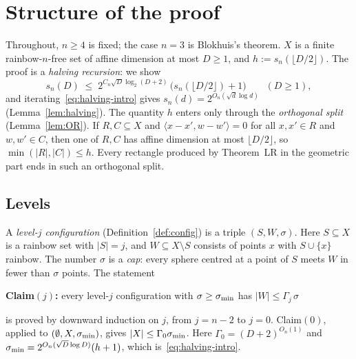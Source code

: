 \section{Structure of the proof}\label{sec:structure}

Throughout, $n\ge 4$ is fixed; the case $n=3$ is Blokhuis's theorem. $X$ is a finite rainbow-$n$-free set of
affine dimension at most $D\ge 1$, and $h:=s_n(\lfloor D/2\rfloor)$. The proof is a \emph{halving recursion}: we
show
\begin{equation}\label{eq:halving-intro}
  s_n(D)\;\le\;2^{C_n\sqrt D\log_2(D+2)}\,\bigl(s_n(\lfloor D/2\rfloor)+1\bigr)\qquad(D\ge 1),
\end{equation}
and iterating~\eqref{eq:halving-intro} gives $s_n(d)=2^{O_n(\sqrt d\log d)}$ (Lemma~\ref{lem:halving}).
The quantity $h$ enters only through the \emph{orthogonal split} (Lemma~\ref{lem:OR}). If $R,C\subseteq X$ and
$\langle x-x',w-w'\rangle=0$ for all $x,x'\in R$ and $w,w'\in C$, then one of $R,C$ has affine dimension at most
$\lfloor D/2\rfloor$, so $\min(|R|,|C|)\le h$. Every rectangle produced by Theorem~LR in the geometric part ends
in such an orthogonal split.

\subsection{Levels}
A \emph{level-$j$ configuration} (Definition~\ref{def:config}) is a triple $(S,W,\sigma)$. Here $S\subseteq X$ is
a rainbow set with $|S|=j$, and $W\subseteq X\setminus S$ consists of points $x$ with $S\cup\{x\}$ rainbow. The
number $\sigma$ is a \emph{cap}: every sphere centred at a point of $S$ meets $W$ in fewer than $\sigma$
points. The statement
\begin{center}
\textbf{Claim$(j)$:} every level-$j$ configuration with $\sigma\ge\sigma_{\min}$ has $|W|\le\Gamma_j\,\sigma$
\end{center}
is proved by downward induction on $j$, from $j=n-2$ to $j=0$. Claim$(0)$, applied to $(\emptyset,X,\sigma_{\min})$,
gives $|X|\le\Gamma_0\sigma_{\min}$. Here $\Gamma_0=(D+2)^{O_n(1)}$ and $\sigma_{\min}=2^{O_n(\sqrt D\log D)}(h+1)$, which
is~\eqref{eq:halving-intro}.

